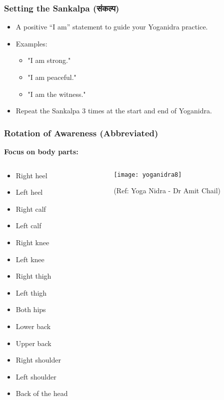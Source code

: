 \begin{frame}[fragile]\frametitle{Setting the Sankalpa (संकल्प)}
    \begin{itemize}
        \item A positive “I am” statement to guide your Yoganidra practice.
        \item Examples:
        \begin{itemize}
            \item "I am strong."
            \item "I am peaceful."
            \item "I am the witness."
        \end{itemize}
        \item Repeat the Sankalpa 3 times at the start and end of Yoganidra.
    \end{itemize}
\end{frame}

\begin{frame}[fragile]\frametitle{Rotation of Awareness (Abbreviated)}
    \textbf{Focus on body parts:}

\begin{columns}
    \begin{column}[T]{0.3\linewidth}
    \begin{itemize}
        \item Right heel
        \item Left heel
        \item Right calf
        \item Left calf
        \item Right knee
        \item Left knee
        \item Right thigh
        \item Left thigh
        \item Both hips
        \item Lower back
        \item Upper back
        \item Right shoulder
        \item Left shoulder
        \item Back of the head
    \end{itemize}

    \end{column}
    \begin{column}[T]{0.7\linewidth}
	      \begin{center}
        \texttt{[image: yoganidra8]}

		{\tiny (Ref: Yoga Nidra - Dr Amit Chail)}		
        \end{center}
    \end{column}
  \end{columns}
  
  

	
	
\end{frame}

